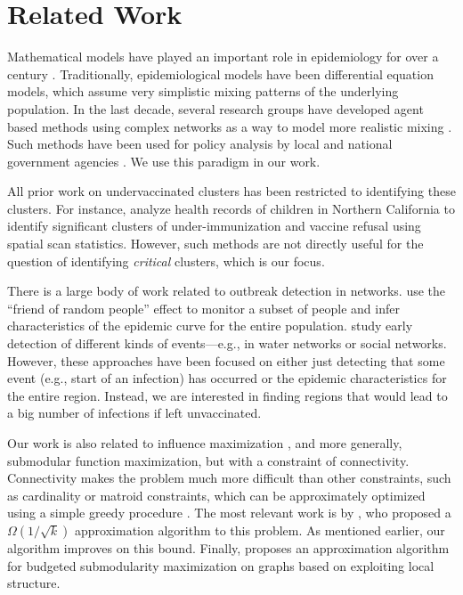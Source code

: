 \section{Related Work}
Mathematical models have played an important role in epidemiology for over a century \cite{anderson+m:book}. Traditionally, epidemiological models have been differential equation models, which assume very simplistic mixing patterns of the underlying population. In the last decade, several research groups have developed agent based methods
using complex networks as a way to model more realistic mixing
\cite{eubank:nature04,longini05:science,fc+06,Liu2015}.
Such methods have been used for policy analysis
by local and national government agencies \cite{halloran:pnas08}.
We use this paradigm in our work.

All prior work on undervaccinated clusters has been restricted to identifying these clusters.
For instance, \cite{lieu2015geographic} analyze health records 
of children in Northern California to identify
significant clusters of under-immunization and vaccine refusal
using spatial scan statistics. However, such methods are not directly useful for the
question of identifying \emph{critical} clusters, which is our focus.

There is a large body of work related to outbreak detection in networks. \cite{christakis:10:sensor} use the ``friend of random people'' effect to monitor a subset of people and infer characteristics of the  epidemic curve for the entire population. \cite{Leskovec@KDD07} study early detection of different kinds of events---e.g., in water networks or social networks. However, these approaches have been focused on either just detecting that some event (e.g., start of an infection) has occurred or the epidemic characteristics for the entire region. Instead, we are interested in finding regions that would lead to a big number of infections if left unvaccinated.

Our work is also related to influence maximization \cite{kempe:sigkdd03}, and more generally, submodular function maximization, but with a constraint of connectivity. Connectivity makes the problem much more difficult than other constraints, such as cardinality or matroid constraints, which can be approximately optimized using a simple greedy procedure \cite{nemhauser1978analysis}. 
The most relevant work is by \cite{kuo2015maximizing}, who proposed a 
$\Omega(1/\sqrt{k})$ approximation algorithm to this problem. As mentioned earlier, our algorithm \algosubmod{} improves on this bound. Finally,
\cite{krause2006near} proposes an approximation algorithm for budgeted 
submodularity maximization on graphs based on exploiting local structure. 


